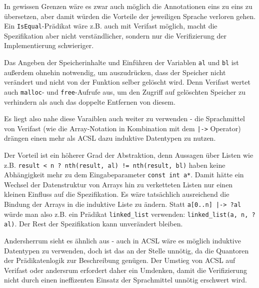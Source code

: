 In gewissen Grenzen wäre es zwar auch möglich die Annotationen eins zu eins zu übersetzen, aber damit
würden die Vorteile der jeweiligen Sprache verloren gehen. Ein \lstinline{IsEqual}-Prädikat wäre z.B.
auch mit Verifast möglich, macht die Spezifikation aber nicht verständlicher, sondern nur die Verifizierung
der Implementierung schwieriger. 

Das Angeben der Speicherinhalte und Einführen der Variablen  \lstinline{al} und \lstinline{bl} ist außerdem
ohnehin notwendig, um auszudrücken, dass der Speicher nicht verändert und nicht von der Funktion selber
gelöscht wird. Denn Verifast wertet auch \lstinline{malloc}- und \lstinline{free}-Aufrufe aus, um 
den Zugriff auf gelöschten Speicher zu verhindern als auch das doppelte Entfernen von diesem.

Es liegt also nahe diese Varaiblen auch weiter zu verwenden - die Sprachmittel von Verifast (wie die Array-Notation in Kombination mit dem
\lstinline{|->} Operator) drängen einen mehr als ACSL dazu induktive Datentypen zu nutzen.

Der Vorteil ist ein höherer Grad der Abstraktion, denn Aussagen über Listen wie z.B.
\lstinline{result < n ? nth(result, al) != nth(result, bl)} haben keine Abhängigkeit mehr zu
dem Eingabeparameter \lstinline{const int a*}. Damit hätte ein Wechsel der Datenstruktur von Arrays
hin zu verketteten Listen nur einen kleinen Einfluss auf die Spezifikation. Es wäre tatsächlich ausreichend
die Bindung der Arrays in die induktive Liste zu ändern. Statt \lstinline{a[0..n] |-> ?al} würde man also
z.B. ein Prädikat \lstinline{linked_list} verwenden: \lstinline{linked_list(a, n, ?al)}. Der Rest der 
Spezifikation kann unverändert bleiben.

Andersherrum sieht es ähnlich aus - auch in ACSL wäre es möglich induktive Datentypen zu verwenden, doch
ist das an der Stelle unnötig, da die Quantoren der Prädikatenlogik zur Beschreibung genügen. 
Der Umstieg von ACSL auf Verifast oder andersrum erfordert daher ein Umdenken, damit die Verifizierung 
nicht durch einen ineffizenten Einsatz der Sprachmittel unnötig erschwert wird.


